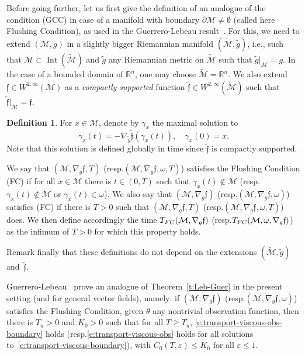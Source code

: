 \documentclass[11pt]{article}
\newcommand{\ie}{i.e.,\xspace}
\newcommand{\resp}{resp.\xspace}
\numberwithin{equation}{section}
\newcommand{\FC}{\textup{FC}}
\newcommand{\pFC}{\textup{(FC)}\xspace}
\newcommand{\pGCC}{\textup{(GCC)}\xspace}
\theoremstyle{definition}
\newtheorem{definition}[lemma]{Definition}
\newcommand{\M}{\ensuremath{\mathcal M}}
\newcommand{\mb}[1]{\ensuremath{\mathbb{#1}}}
\newcommand{\R}{{\mb{R}}}
\newcommand{\f}{\ensuremath{\mathfrak{f}}}
\DeclareMathOperator{\Int}{Int}
\let\d\partial
\let\eps\varepsilon
\begin{document}
Before going further, let us first give the definition of an analogue of the condition \pGCC in case of a manifold with boundary $\d\M \neq \emptyset$ (called here Flushing Condition), as used in the Guerrero-Lebeau result~\cite{GL:07}. For this, we need to extend $(\M,g)$ in a slightly bigger Riemannian manifold $(\tilde{\M}, \tilde{g})$, \ie such that $\M\subset \Int(\tilde{\M})$ and $\tilde{g}$ any Riemannian metric on $\tilde{\M}$ such that $\tilde{g}|_{\M}=g$. In the case of a bounded domain of $\R^n$, one may choose $\tilde{\M} = \R^n$. We also extend $\f \in W^{2,\infty}(\M)$ as a {\em compactly supported } function $\tilde{\f}\in W^{2,\infty}(\tilde{\M})$ such that $\tilde{\f}|_{\M} = \f$.
\begin{definition}
\label{d:def-GCC_bdry}
For $x\in \M$, denote by $\gamma_x$ the maximal solution to
\[
\dot{\gamma}_x(t) = -\nabla_{\tilde{g}}\tilde{\f}(\gamma_x(t)), \quad \gamma_x(0)=x. 
\]
Note that this solution is defined globally in time since $\tilde{\f}$ is compactly supported.

We say that $(\M,\nabla_g \f,T)$ (\resp $(\M,\nabla_g \f,\omega,T)$) satisfies the Flushing Condition \pFC if for all $x\in \M$ there is $t\in (0,T)$ such that $\gamma_x(t)\notin \M$ (\resp $\gamma_x(t)\notin \M$ or $\gamma_x(t)\in \omega$). We also say that $(\M,\nabla_g \f)$ (\resp $(\M,\nabla_g \f,\omega)$) satisfies \pFC if there is $T>0$ such that $(\M,\nabla_g \f,T)$ (\resp $(\M,\nabla_g \f,\omega,T)$) does. We then define accordingly the time $T_{\FC}(\M,\nabla_g \f)$ (\resp $T_{\FC}(\M,\omega,\nabla_g \f)$) as the infimum of $T>0$ for which this property holds.

Remark finally that these definitions do not depend on the extensions $(\tilde{\M}, \tilde{g})$ and~$\tilde{\f}$.
\end{definition}

Guerrero-Lebeau~\cite{GL:07} prove an analogue of Theorem~\ref{t:Leb-Guer} in the present setting (and for general vector fields), namely: if $(\M,\nabla_g \f)$ (\resp $(\M,\nabla_g \f,\omega)$) satisfies the Flushing Condition, given $\theta$ any nontrivial observation function, then there is $T_{u}>0$ and $K_0>0$ such that for all $T\geq T_{u}$, \eqref{e:transport-viscous-obs-boundary} holds (\resp \eqref{e:transport-viscous-obs} holds for all solutions to~\eqref{e:transport-viscous-boundary}), with $C_0(T,\eps)\leq K_0$ for all $\eps \leq 1$.
\end{document}

